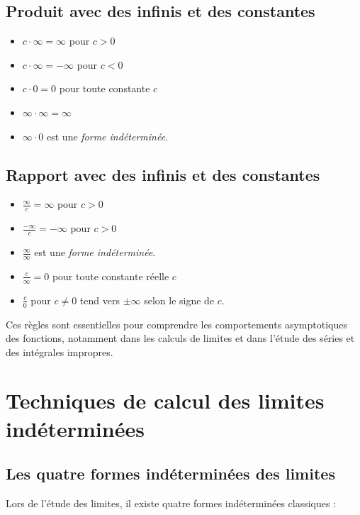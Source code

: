 \documentclass{article}
\begin{document}
	\subsection{Produit avec des infinis et des constantes}
	\begin{itemize}
		\item $c \cdot \infty = \infty$ \quad pour \( c > 0 \)
		\item $c \cdot \infty = -\infty$ \quad pour \( c < 0 \)
		\item $c \cdot 0 = 0$ \quad pour toute constante \( c \)
		\item $\infty \cdot \infty = \infty$
		\item $\infty \cdot 0$ est une \textit{forme indéterminée}.
	\end{itemize}
	
	\subsection{Rapport avec des infinis et des constantes}
	\begin{itemize}
		\item $\frac{\infty}{c} = \infty$ \quad pour \( c > 0 \)
		\item $\frac{-\infty}{c} = -\infty$ \quad pour \( c > 0 \)
		\item $\frac{\infty}{\infty}$ est une \textit{forme indéterminée}.
		\item $\frac{c}{\infty} = 0$ \quad pour toute constante réelle \( c \)
		\item $\frac{c}{0}$ pour \( c \neq 0 \) tend vers \( \pm \infty \) selon le signe de \( c \).
	\end{itemize}
	
	Ces règles sont essentielles pour comprendre les comportements asymptotiques des fonctions, notamment dans les calculs de limites et dans l'étude des séries et des intégrales impropres.
	
	\section{Techniques de calcul des limites indéterminées}
	
	\subsection{Les quatre formes indéterminées des limites}
	
	Lors de l'étude des limites, il existe quatre formes indéterminées classiques :
	
\end{document}
